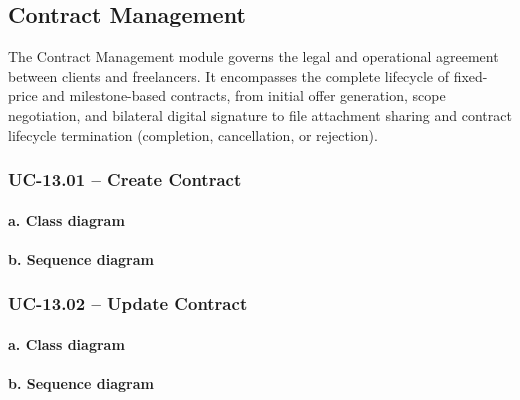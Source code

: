 
\subsection{Contract Management}

The Contract Management module governs the legal and operational agreement between clients and freelancers. It encompasses the complete lifecycle of fixed-price and milestone-based contracts, from initial offer generation, scope negotiation, and bilateral digital signature to file attachment sharing and contract lifecycle termination (completion, cancellation, or rejection).

\subsubsection{UC-13.01 -- Create Contract}

\paragraph*{a. Class diagram}

\paragraph*{b. Sequence diagram}

\subsubsection{UC-13.02 -- Update Contract}

\paragraph*{a. Class diagram}

\paragraph*{b. Sequence diagram}

